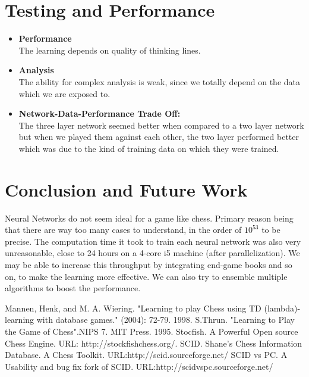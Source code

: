 \documentclass[a4paper,12pt,latin modern roman]{article}
\begin{document}
\section{Testing and Performance}

\begin{itemize}
\item \textbf{Performance}\\
The learning depends on quality of thinking lines.
\item \textbf{Analysis}\\
The ability for complex analysis is weak, since we totally depend on the data which we are exposed to.
\item \textbf{Network-Data-Performance Trade Off:}\\
The three layer network seemed better when compared to a two layer network but when we played them against each other, the two layer performed better which was due to the kind of training data on which they were trained.
\end{itemize}

\section{Conclusion and Future Work}

Neural Networks do not seem ideal for a game like chess. Primary reason being that there are way too many cases to understand, in the order of \begin{math}10^{53}\end{math} to be precise. The computation time it took to train each neural network was also very unreasonable, close to 24 hours on a 4-core i5 machine (after parallelization). We may be able to increase this throughput by integrating end-game books and so on, to make the learning more effective. We can also try to ensemble multiple algorithms to boost the performance. 

\pagebreak
\begin{thebibliography}{}
 Mannen, Henk, and M. A. Wiering. "Learning to play Chess using TD (lambda)-learning with database games." (2004): 72-79.
1998.
 S.Thrun. "Learning to Play the Game of Chess".NIPS 7. MIT Press. 1995.
 Stocfish. A Powerful Open source Chess Engine. URL: http://stockfishchess.org/.
 SCID. Shane's Chess Information Database. A Chess Toolkit.  URL:http://scid.sourceforge.net/
 SCID vs PC. A Usability and bug fix fork of SCID. URL:http://scidvspc.sourceforge.net/


\end{thebibliography}
\end{document}
